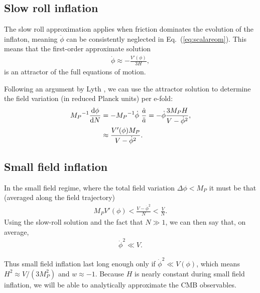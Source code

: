\documentclass[aps,amsfonts,amsmath,prd,preprint,nofootinbib,superscriptaddress]{revtex4}
\newcommand{\Mp}{{M_{P}}}
\newcommand{\MMp}{{M_P^2}}
\newcommand{\rmd}{{\rm d}}
\begin{document}














\subsection{Slow roll inflation}

The slow roll approximation applies when friction dominates the evolution of the inflaton, meaning $\ddot \phi$ can be consistently neglected in  Eq.~(\ref{eq:scalareom}).  
This means that the first-order approximate solution
\begin{align}
\dot\phi \approx -\frac{V'(\phi)}{3 H},
\end{align}
is an attractor of the full equations of motion.


Following an argument by Lyth \cite{lythbound}, we can use the attractor solution to determine the field variation (in reduced Planck units) per e-fold:
\begin{align}
\Mp^{-1}\frac{\rmd \phi}{\rmd N} &= -\Mp^{-1}\dot\phi~\frac{\dot a}{\ddot a} = -\dot\phi \frac{3\Mp H}{V-\dot\phi^2},\\
&\approx \frac{V'(\phi)\Mp}{V-\dot\phi^2}.
\end{align}


\subsection{Small field inflation}
In the small field regime, where the total field variation $\Delta \phi < \Mp$ it must be that (averaged along the field trajectory)
\begin{align}
\Mp V'(\phi) <  \frac{V - \dot\phi^2}{N} <  \frac{V}{N}.
\end{align} 
Using the slow-roll solution and the fact that $N \gg 1$, we can then say that, on average,
\begin{align}
\dot\phi^2 \ll V.
\end{align}

Thus small field inflation last long enough only if $\dot\phi^2 \ll V(\phi)$, which means $H^2 \approx V/(3\MMp)$ and $w \approx -1$.
Because $H$ is nearly constant during small field inflation, we will be able to analytically approximate the CMB observables.
\end{document}
